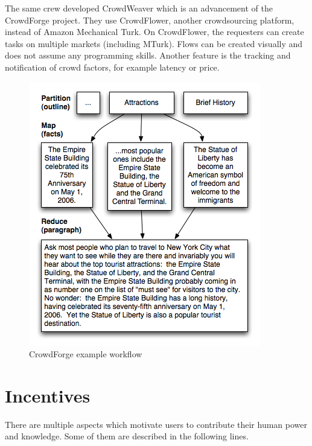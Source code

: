 The same crew developed CrowdWeaver\cite{crowdweaver} which is an advancement of the CrowdForge project. They use CrowdFlower, another crowdsourcing platform, instead of Amazon Mechanical Turk. On CrowdFlower, the requesters can create tasks on multiple markets (including MTurk). Flows can be created visually and does not assume any programming skills. Another feature is the tracking and notification of crowd factors, for example latency or price.
\begin{figure}
\centering
\includegraphics[scale=0.6]{images/crowdforge-article.png}
\caption{CrowdForge example workflow}
\label{crowdforgeflow}
\end{figure}
\section{Incentives}
There are multiple aspects which motivate users to contribute their human power and knowledge. Some of them are described in the following lines.
